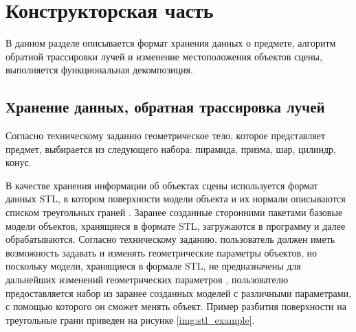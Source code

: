\chapter{Конструкторская часть}

В данном разделе описывается формат хранения данных о предмете, алгоритм обратной трассировки лучей и изменение местоположения объектов сцены, выполняется функциональная декомпозиция.

\section{Хранение данных, обратная трассировка лучей}

Согласно техническому заданию геометрическое тело, которое представляет предмет, выбирается из следующего набора: пирамида, призма, шар, цилиндр, конус.

\iffalse
В проектируемом ПО пирамида и призма представляются разбитием на треугольные грани, пример которого представлен на рисунке \ref{img:tri_set}.

\includeimage{tri_set}{f}{h}{0.9\textwidth}{Разбитие поверхностей призмы и пирамиды на треугольные грани}

Шар, цилиндр и конус задаются уравнениями, приведенными в формулах \ref{eq:sphere}, \ref{eq:cyl} соответственно.

\begin{equation}\label{eq:sphere}
	F(\overrightarrow{P}) = (\overrightarrow{P}, \overrightarrow{P}) - 1,
\end{equation}
где $\overrightarrow{P}$ --- вектор, начало которого находится в центре окружности, а конец --- на ее поверхности.

\begin{equation}\label{eq:cyl}
	F(P) = P_x^2 + P_y^2 - [1 + (s - 1) \cdot P_z^2]^2,
\end{equation}
где $P$ --- точка, принадлежащая поверхности цилиндра.
\fi

В качестве хранения информации об объектах сцены используется формат данных STL, в котором поверхности модели объекта и их нормали описываются списком треугольных граней \cite{szilvsi2003analysis}.
Заранее созданные сторонними пакетами базовые модели объектов, хранящиеся в формате STL, загружаются в программу и далее обрабатываются.
Согласно техническому заданию, пользователь должен иметь возможность задавать и изменять геометрические параметры объектов, но поскольку модели, хранящиеся в формале STL, не предназначены для дальнейших изменений геометрических параметров \cite{szilvsi2003analysis}, пользователю предоставляется набор из заранее созданных моделей с различными параметрами, с помощью которого он сможет менять объект.
Пример разбития поверхности на треугольные грани приведен на рисунке \ref{img:stl_example}.

